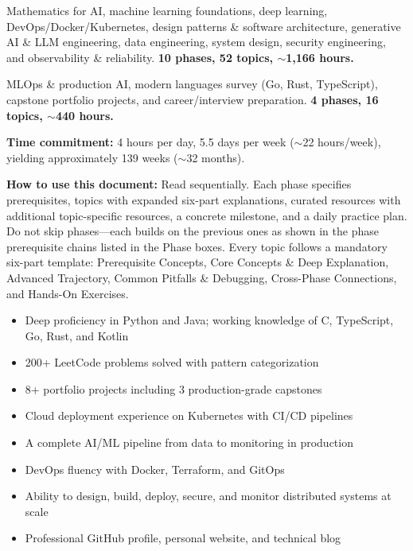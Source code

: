 \documentclass[11pt, a4paper, oneside]{report}
\begin{document}
\begin{tieroverviewbox}[title={\textbf{Tier 3: Specialization (Weeks 66--116, Phases 12--21)}}]
Mathematics for AI, machine learning foundations, deep learning, DevOps/Docker/Kubernetes, design patterns \& software architecture, generative AI \& LLM engineering, data engineering, system design, security engineering, and observability \& reliability. \textbf{10 phases, 52 topics, $\sim$1,166 hours.}
\end{tieroverviewbox}

\begin{tieroverviewbox}[title={\textbf{Tier 4: Mastery \& Career (Weeks 117--130, Phases 22--25)}}]
MLOps \& production AI, modern languages survey (Go, Rust, TypeScript), capstone portfolio projects, and career/interview preparation. \textbf{4 phases, 16 topics, $\sim$440 hours.}
\end{tieroverviewbox}

\textbf{Time commitment:} 4 hours per day, 5.5 days per week ($\sim$22 hours/week), yielding approximately 139 weeks ($\sim$32 months).

\textbf{How to use this document:} Read sequentially. Each phase specifies prerequisites, topics with expanded six-part explanations, curated resources with additional topic-specific resources, a concrete milestone, and a daily practice plan. Do not skip phases---each builds on the previous ones as shown in the phase prerequisite chains listed in the Phase boxes. Every topic follows a mandatory six-part template: Prerequisite Concepts, Core Concepts \& Deep Explanation, Advanced Trajectory, Common Pitfalls \& Debugging, Cross-Phase Connections, and Hands-On Exercises.

\begin{tcolorbox}[colback=green!3, colframe=green!50!black, title={\textbf{What ``Done'' Looks Like --- Portfolio Outcomes}}, fonttitle=\bfseries\small, boxrule=0.5pt, arc=3pt, breakable, enhanced jigsaw]
\begin{itemize}[leftmargin=*]
\item Deep proficiency in Python and Java; working knowledge of C, TypeScript, Go, Rust, and Kotlin
\item 200+ LeetCode problems solved with pattern categorization
\item 8+ portfolio projects including 3 production-grade capstones
\item Cloud deployment experience on Kubernetes with CI/CD pipelines
\item A complete AI/ML pipeline from data to monitoring in production
\item DevOps fluency with Docker, Terraform, and GitOps
\item Ability to design, build, deploy, secure, and monitor distributed systems at scale
\item Professional GitHub profile, personal website, and technical blog
\end{itemize}
\end{tcolorbox}
\end{document}
